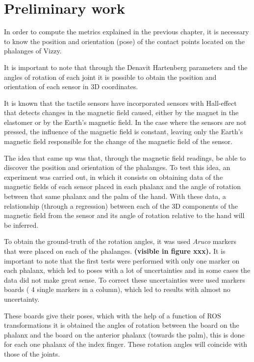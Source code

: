 \chapter{Preliminary work}
\label{chapter:pre_work}
In order to compute the metrics explained in the previous chapter, it is necessary to know the position and orientation (pose) of the contact points located on the phalanges of Vizzy.
\par

It is important to note that through the Denavit Hartenberg parameters and the angles of rotation of each joint it is possible to obtain the position and orientation of each sensor in 3D coordinates.

\par
It is known that the tactile sensors have incorporated sensors with Hall-effect that detects changes in the magnetic field caused, either by the magnet in the elastomer or by the Earth's magnetic field.
In the case where the sensors are not pressed, the influence of the magnetic field is constant, leaving only the Earth's magnetic field responsible for the change of the magnetic field of the sensor.

\par

The idea that came up was that, through the magnetic field readings, be able to discover the position and orientation of the phalanges. To test this idea, an experiment was carried out, in which it consists on obtaining data of the magnetic fields of each sensor placed in each phalanx and the angle of rotation between that same phalanx and the palm of the hand.
With these data, a relationship (through a regression) between each of the 3D components of the magnetic field from the sensor and its angle of rotation relative to the hand will be inferred.
\par

To obtain the ground-truth of the rotation angles, it was used \textit{Aruco} markers that were placed on each of the phalanges. \textbf{(visible in figure xxx).}
It is important to note that the first tests were performed with only one marker on each phalanx, which led to poses with a lot of uncertainties and in some cases the data did not make great sense. To correct these uncertainties were used markers boards ( 4 single markers in a column), which led to results with almost no uncertainty.

\par
These boards give their poses, which with the help of a function of ROS transformations it is obtained the angles of rotation between the board on the phalanx and the board on the anterior phalanx (towards the palm), this is done for each one phalanx of the index finger. These rotation angles will coincide with those of the joints.

